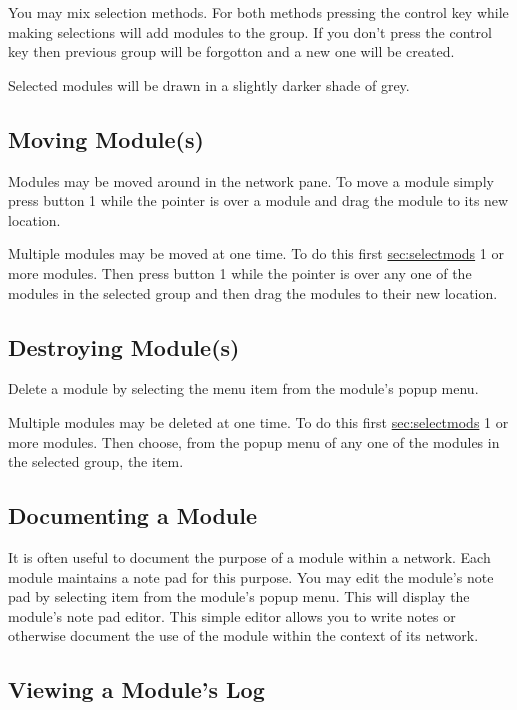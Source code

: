 You may mix selection methods.  For both methods pressing the control key
while making selections will add modules to the group.  If you don't press
the control key then previous group will be forgotton and a new one
will be created.

Selected modules will be drawn in a slightly darker shade of grey.

\subsection{Moving Module(s)}
\label{sec:movemod}

Modules may be moved around in the network pane.  To move a module simply
press button 1 while the pointer is over a module and drag the module to
its new location.

Multiple modules may be moved at one time.  To do this first
\hyperref{select}{select (see Section~}{)}{sec:selectmods} 1 or more
modules. Then press button 1 while the pointer is over any one of the
modules in the selected group and then drag the modules to their new location.


\subsection{Destroying Module(s)}
\label{sec:destroymod}

Delete a module by selecting the  menu item from the
module's popup menu.

Multiple modules may be deleted at one time.  To do this first
\hyperref{select}{select (see Section~}{)}{sec:selectmods} 1 or more
modules. Then choose, from the popup menu of any one of the modules in the
selected group, the  item.


\subsection{Documenting a Module}
\label{sec:docmodule}

It is often useful to document the purpose of a module within a network.
Each module maintains a note pad for this purpose.  You may edit the
module's note pad by selecting  item from the module's
popup menu.  This will display the module's note pad editor.  This simple
editor allows you to write notes or otherwise document the use of the
module within the context of its network.

\subsection{Viewing a Module's Log}
\label{sec:viewmodslog}

